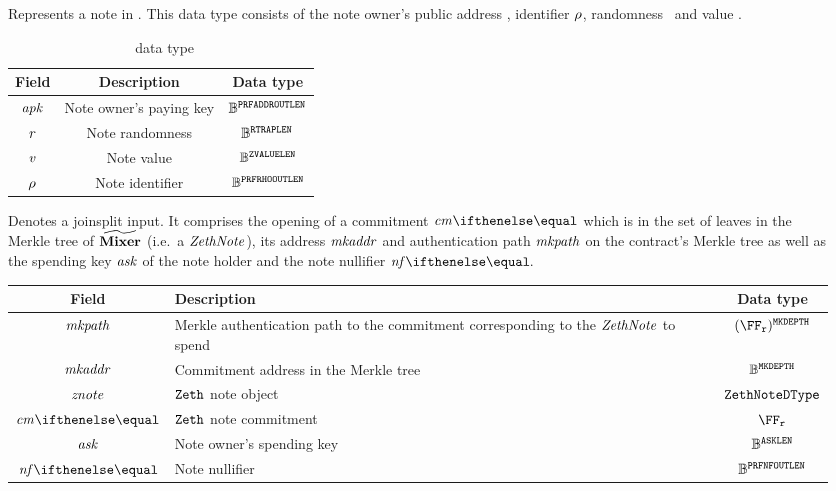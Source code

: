 \begin{description}
    \item[\zethNoteDType] Represents a note in \zeth. This data type consists of the note owner's public address \apk, identifier $\mathit{\rho}$, randomness \noter{}~and value \notev.
        \begin{table}[H]
        \centering
        \begin{tabular}{ccc}
            Field & Description & Data type\\ \toprule
            $\mathit{apk}$ & Note owner's paying key & $\mathbb{B}^{\mathtt{PRFADDROUTLEN}}$\\ \midrule
            $\mathit{r}$ & Note randomness & $\mathbb{B}^{\mathtt{RTRAPLEN}}$\\ \midrule
            $\mathit{v}$ & Note value & $\mathbb{B}^{\mathtt{ZVALUELEN}}$ \\ \midrule
            $\mathit{\rho}$ & Note identifier & $\mathbb{B}^{\mathtt{PRFRHOOUTLEN}}$\\ \bottomrule
        \end{tabular}
        \caption{\zethNoteDType~data type}\label{zeth-protocol:tab:zethnote}
        \end{table}
    \item[\jsInputDType] Denotes a \gls{joinsplit} input. It comprises the opening of a commitment $\cm{}$ which is in the set of leaves in the Merkle tree of $\widetilde{\mathbf{Mixer}}$ (i.e.~a $\mathit{ZethNote}$), its address $\mathit{mkaddr}$ and authentication path $\mathit{mkpath}$ on the contract's Merkle tree as well as the spending key $\mathit{ask}$ of the note holder and the note nullifier $\nf{}$.
        \begin{table}[H]
        \centering
        \begin{tabular}{cp{20em}c}
            Field & Description & Data type\\ \toprule
            $\mathit{mkpath}$ & Merkle authentication path to the commitment corresponding to the $\mathit{ZethNote}$ to spend & $(\FFx{\rCURVE})^{\mkTreeDepth}$ \\ \midrule
            $\mathit{mkaddr}$ & Commitment address in the Merkle tree & $\mathbb{B}^{\mathtt{MKDEPTH}}$\\ \midrule
            $\mathit{znote}$ & $\texttt{Zeth}{}$ note object & ${\mathtt{ZethNoteDType}}$ \\ \midrule
            $\cm{}$ & $\texttt{Zeth}{}$ note commitment & $\FFx{\rCURVE}$ \\ \midrule
            $\mathit{ask}$ & Note owner's spending key & $\mathbb{B}^{\mathtt{ASKLEN}}$\\ \midrule
            $\nf{}$ & Note nullifier & $\mathbb{B}^{\mathtt{PRFNFOUTLEN}}$\\ \bottomrule

\end{tabular}
\end{table}
\end{description}
